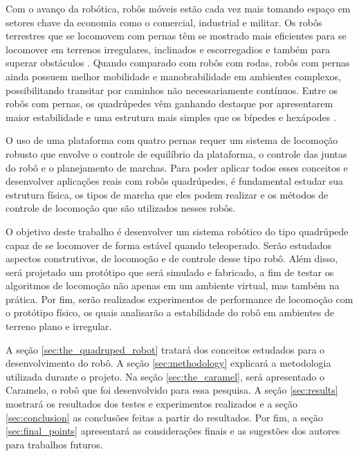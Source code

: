 \documentclass[../main.tex]{subfiles}
\begin{document}
Com o avanço da robótica, robôs móveis estão cada vez mais tomando espaço em setores chave da economia como o comercial, industrial e militar. Os robôs terrestres que se locomovem com pernas têm se mostrado mais eficientes para se locomover em terrenos irregulares, inclinados e escorregadios e também para superar obstáculos \cite{X.134}. Quando comparado com robôs com rodas, robôs com pernas ainda possuem melhor mobilidade e manobrabilidade em ambientes complexos, possibilitando transitar por caminhos não necessariamente contínuos. Entre os robôs com pernas, os quadrúpedes vêm ganhando destaque por apresentarem maior estabilidade e uma estrutura mais simples que os bípedes e hexápodes \cite{Shi2021}.


O uso de uma plataforma com quatro pernas requer um sistema de locomoção robusto que envolve o controle de equilíbrio da plataforma, o controle das juntas do robô e o planejamento de marchas. Para poder aplicar todos esses conceitos e desenvolver aplicações reais com robôs quadrúpedes, é fundamental estudar sua estrutura física, os tipos de marcha que eles podem realizar e os métodos de controle de locomoção que são utilizados nesses robôs.

O objetivo deste trabalho é desenvolver um sistema robótico do tipo quadrúpede capaz de se locomover de forma estável quando teleoperado. Serão estudados aspectos construtivos, de locomoção e de controle desse tipo robô. Além disso, será projetado um protótipo que será simulado e fabricado, a fim de testar os algoritmos de locomoção não apenas em um ambiente virtual, mas também na prática. Por fim, serão realizados experimentos de performance de locomoção com o protótipo físico, os quais analisarão a estabilidade do robô em ambientes de terreno plano e irregular.

A seção \ref{sec:the_quadruped_robot} tratará dos conceitos estudados para o desenvolvimento do robô. A seção \ref{sec:methodology} explicará a metodologia utilizada durante o projeto. Na seção \ref{sec:the_caramel}, será apresentado o Caramelo, o robô que foi desenvolvido para essa pesquisa. A seção \ref{sec:results} mostrará os resultados dos testes e experimentos realizados e a seção \ref{sec:conclusion} as conclusões feitas a partir do resultados. Por fim, a seção \ref{sec:final_points} apresentará as considerações finais e as sugestões dos autores para trabalhos futuros.
\end{document}
